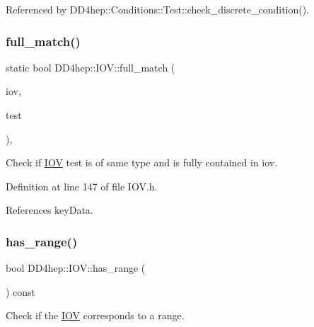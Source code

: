 Referenced by D\+D4hep\+::\+Conditions\+::\+Test\+::check\+\_\+discrete\+\_\+condition().

\hypertarget{class_d_d4hep_1_1_i_o_v_aa1b5388443f86ca31d23c99a34f444c5}{}\label{class_d_d4hep_1_1_i_o_v_aa1b5388443f86ca31d23c99a34f444c5} 
\subsubsection{\texorpdfstring{full\+\_\+match()}{full\_match()}}
{\footnotesize\ttfamily static bool D\+D4hep\+::\+I\+O\+V\+::full\+\_\+match (\begin{DoxyParamCaption}\item[{const \hyperlink{class_d_d4hep_1_1_i_o_v}{I\+OV} \&}]{iov,  }\item[{const \hyperlink{class_d_d4hep_1_1_i_o_v}{I\+OV} \&}]{test }\end{DoxyParamCaption})\hspace{0.3cm}{\ttfamily [inline]}, {\ttfamily [static]}}



Check if \hyperlink{class_d_d4hep_1_1_i_o_v}{I\+OV} \textquotesingle{}test\textquotesingle{} is of same type and is fully contained in iov. 



Definition at line 147 of file I\+O\+V.\+h.



References key\+Data.

\hypertarget{class_d_d4hep_1_1_i_o_v_aac9c5f6a22219991896f6a846b3f3649}{}\label{class_d_d4hep_1_1_i_o_v_aac9c5f6a22219991896f6a846b3f3649} 
\subsubsection{\texorpdfstring{has\+\_\+range()}{has\_range()}}
{\footnotesize\ttfamily bool D\+D4hep\+::\+I\+O\+V\+::has\+\_\+range (\begin{DoxyParamCaption}{ }\end{DoxyParamCaption}) const\hspace{0.3cm}{\ttfamily [inline]}}



Check if the \hyperlink{class_d_d4hep_1_1_i_o_v}{I\+OV} corresponds to a range. 



